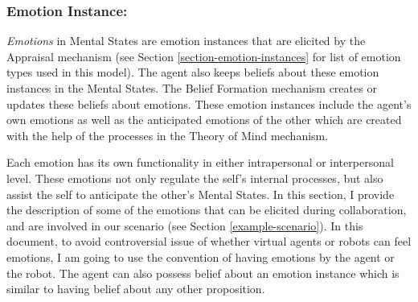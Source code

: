 \documentclass[letterpaper]{article}
\begin{document}
\subsubsection{Emotion Instance:}

\textit{Emotions} in Mental States are emotion instances that are elicited by
the Appraisal mechanism (see Section \ref{section-emotion-instances} for list of
emotion types used in this model). The agent also keeps beliefs about these
emotion instances in the Mental States. The Belief Formation mechanism creates
or updates these beliefs about emotions. These emotion instances include the
agent's own emotions as well as the anticipated emotions of the other which are
created with the help of the processes in the Theory of Mind mechanism.

Each emotion has its own functionality in either intrapersonal or interpersonal
level. These emotions not only regulate the self's internal processes, but also
assist the self to anticipate the other's Mental States. In this section, I
provide the description of some of the emotions that can be elicited during
collaboration, and are involved in our scenario (see Section
\ref{example-scenario}). In this document, to avoid controversial issue of
whether virtual agents or robots can feel emotions, I am going to use the
convention of having emotions by the agent or the robot. The agent can also
possess belief about an emotion instance which is similar to having belief about
any other proposition.
\end{document}

